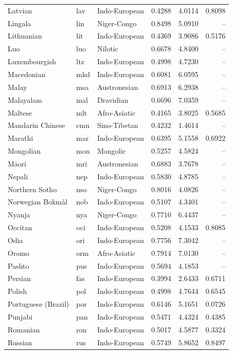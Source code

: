 \begin{longtable}{p{3.1cm}p{0.9cm}p{2.7cm}rrr}
Latvian & lav & Indo-European & 0.4288 & 4.0114 & 0.8098\\
Lingala & lin & Niger-Congo & 0.8498 & 5.0910 & --\\
Lithuanian & lit & Indo-European & 0.4369 & 3.9086 & 0.5176\\
Luo & luo & Nilotic & 0.6678 & 4.8400 & --\\
Luxembourgish & ltz & Indo-European & 0.4998 & 4.7230 & --\\
Macedonian & mkd & Indo-European & 0.6081 & 6.0595 & --\\
Malay & msa & Austronesian & 0.6913 & 6.2938 & --\\
Malayalam & mal & Dravidian & 0.6696 & 7.0359 & --\\
Maltese & mlt & Afro-Asiatic & 0.4165 & 3.8025 & 0.5685\\
Mandarin Chinese & cmn & Sino-Tibetan & 0.4232 & 1.4614 & --\\
Marathi & mar & Indo-European & 0.6395 & 5.1558 & 0.6922\\
Mongolian & mon & Mongolic & 0.5257 & 4.5824 & --\\
Māori & mri & Austronesian & 0.6883 & 3.7678 & --\\
Nepali & nep & Indo-European & 0.5830 & 4.8785 & --\\
Northern Sotho & nso & Niger-Congo & 0.8016 & 4.0826 & --\\
Norwegian Bokmål & nob & Indo-European & 0.5107 & 4.3401 & --\\
Nyanja & nya & Niger-Congo & 0.7710 & 6.4437 & --\\
Occitan & oci & Indo-European & 0.5208 & 4.1533 & 0.8085\\
Odia & ori & Indo-European & 0.7756 & 7.3042 & --\\
Oromo & orm & Afro-Asiatic & 0.7914 & 7.0130 & --\\
Pashto & pus & Indo-European & 0.5694 & 4.1853 & --\\
Persian & fas & Indo-European & 0.3994 & 2.6433 & 0.6711\\
Polish & pol & Indo-European & 0.4998 & 4.7644 & 0.6545\\
Portuguese (Brazil) & por & Indo-European & 0.6146 & 5.1651 & 0.0726\\
Punjabi & pan & Indo-European & 0.5471 & 4.4324 & 0.4385\\
Romanian & ron & Indo-European & 0.5017 & 4.5877 & 0.3324\\
Russian & rus & Indo-European & 0.5749 & 5.8652 & 0.8497\\

\end{longtable}
